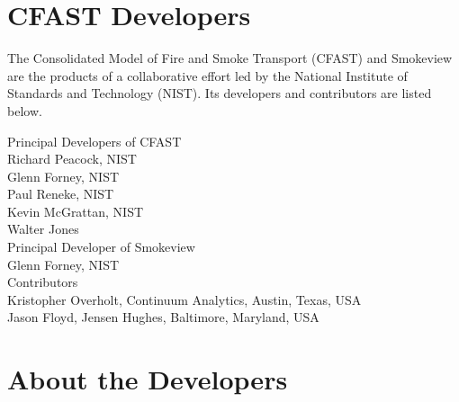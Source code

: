 \chapter{CFAST Developers}

The Consolidated Model of Fire and Smoke Transport (CFAST) and Smokeview are the products of a collaborative effort led by the National Institute of Standards and Technology (NIST). Its developers and contributors are listed below.

\vspace{0.3in}

\begin{flushleft}

Principal Developers of CFAST  \\ [0.2in]

Richard Peacock, NIST \\
Glenn Forney, NIST \\
Paul Reneke, NIST \\
Kevin McGrattan, NIST \\
Walter Jones \\ [0.3in]

Principal Developer of Smokeview  \\ [0.2in]

Glenn Forney, NIST \\ [0.3in]

Contributors \\ [0.2in]

Kristopher Overholt, Continuum Analytics, Austin, Texas, USA \\ [0.3in]
Jason Floyd, Jensen Hughes, Baltimore, Maryland, USA \\

\end{flushleft}


\chapter{About the Developers}

